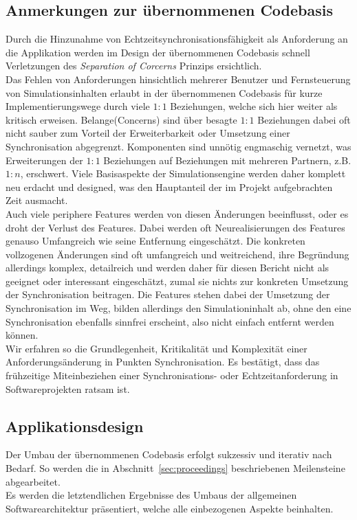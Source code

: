 \documentclass[11pt,twoside,a4paper]{article}
\begin{document}
\subsection{Anmerkungen zur übernommenen Codebasis}
Durch die Hinzunahme von Echtzeitsynchronisationsfähigkeit als Anforderung an die Applikation werden im Design der übernommenen Codebasis schnell Verletzungen des \textit{Separation of Corcerns} Prinzips ersichtlich.\\
Das Fehlen von Anforderungen hinsichtlich mehrerer Benutzer und Fernsteuerung von Simulationsinhalten erlaubt in der übernommenen Codebasis für kurze Implementierungswege durch viele $1:1$ Beziehungen, welche sich hier weiter als kritisch erweisen. Belange(Concerns) sind über besagte $1:1$ Beziehungen dabei oft nicht sauber zum Vorteil der Erweiterbarkeit oder Umsetzung einer Synchronisation abgegrenzt. Komponenten sind unnötig engmaschig vernetzt, was Erweiterungen der $1:1$ Beziehungen auf Beziehungen mit mehreren Partnern, z.B. $1:n$, erschwert. 
Viele Basisaspekte der Simulationsengine werden daher komplett neu erdacht und designed, was den Hauptanteil der im Projekt aufgebrachten Zeit ausmacht.\\
Auch viele periphere Features werden von diesen Änderungen beeinflusst, oder es droht der Verlust des Features. Dabei werden oft Neurealisierungen des Features genauso Umfangreich wie seine Entfernung eingeschätzt.
Die konkreten vollzogenen Änderungen sind oft umfangreich und weitreichend, ihre Begründung allerdings komplex, detailreich und werden daher für diesen Bericht nicht als geeignet oder interessant eingeschätzt, zumal sie nichts zur konkreten Umsetzung der Synchronisation beitragen. Die Features stehen dabei der Umsetzung der Synchronisation im Weg, bilden allerdings den Simulationinhalt ab, ohne den eine Synchronisation ebenfalls sinnfrei erscheint, also nicht einfach entfernt werden können.\\
Wir erfahren so die Grundlegenheit, Kritikalität und Komplexität einer Anforderungsänderung in Punkten Synchronisation.
Es bestätigt, dass das frühzeitige Miteinbeziehen einer Synchronisations- oder Echtzeitanforderung in Softwareprojekten ratsam ist.

\subsection{Applikationsdesign}
Der Umbau der übernommenen Codebasis erfolgt sukzessiv und iterativ nach Bedarf. 
So werden die in Abschnitt~\ref{sec:proceedings} beschriebenen Meilensteine abgearbeitet.\\
Es werden die letztendlichen Ergebnisse des Umbaus der allgemeinen Softwarearchitektur präsentiert, welche alle einbezogenen Aspekte beinhalten.
\end{document}
